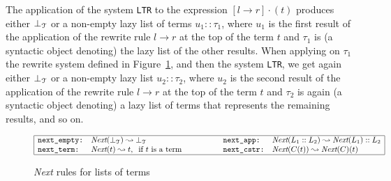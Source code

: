 \documentclass[submission,copyright,creativecommons]{eptcs}
\newcommand \rrule[2]{#1\rightarrow #2}
\numberwithin{subcase}{case}
\begin{document}
 The application of the system
\texttt{LTR} to the expression $[\rrule{l}{r}]\cdot(t)$ produces either
$\bot_{\EuScript{T}}$ or a non-empty lazy list of terms $u_1 :: \tau_1$,
where $u_1$ is the first result of the application of the rewrite rule $\rrule{l}{r}$ at the top of the
term $t$ and $\tau_1$ is (a syntactic object denoting) the lazy list of the
other results. When applying on $\tau_1$ the rewrite system defined in
Figure~\ref{Next:term},
 and then the system \texttt{LTR}, we get again
either $\bot_{\EuScript{T}}$ or a non-empty lazy list $u_2 :: \tau_2$, where $u_2$ is
the second result of the application of the rewrite rule $\rrule{l}{r}$ at the top of the
term $t$ and $\tau_2$ is again (a syntactic object denoting) a lazy list of
terms that represents the remaining results, and so on. 

\begin{figure}[hbt!]
\begin{align*}
\begin{array}{|l l l l|}
\hline
\texttt{next\_empty:}&  \textit{Next}(\bot_{\EuScript{T}}) \leadsto \bot_{\EuScript{T}}
&\hspace{1.5cm} \texttt{next\_app:}&  \textit{Next}(L_1 :: L_2) \leadsto 
  \textit{Next}(L_1) :: L_2  \\
\texttt{next\_term:}&  \textit{Next}(t) \leadsto t,  \;\; \textrm{if } t \textrm{
is a term} 
&\hspace{1.5cm} \texttt{next\_cstr:}& \textit{Next}(C(t)) \leadsto 
 \textit{Next}(C)(t) \\
\hline 
\end{array}
\end{align*}
\caption{\textit{Next} rules for lists of terms\label{Next:term}}
\end{figure}
\end{document}
